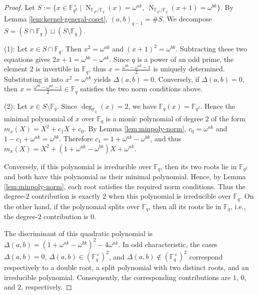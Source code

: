 \documentclass[10pt,a4paper]{article}
\newcommand{\Norm}{\operatorname{N}}
\numberwithin{equation}{section}
\begin{document}
\begin{proof}
Let
$S:=\{x\in \mathbb{F}_{q^2}^\times\mid \Norm_{\mathbb{F}_{q^2}/\mathbb{F}_q}(x)=\omega^{ak},\ \Norm_{\mathbb{F}_{q^2}/\mathbb{F}_q}(x+1)=\omega^{bk}\}$. By Lemma \ref{lem:kernel-general-coset}, $(a,b)_{q-1}=\#S$. We decompose $S=(S\cap \mathbb{F}_{q})\sqcup(S\setminus \mathbb{F}_{q})$.

\noindent\textup{(1)}: Let $x\in S\cap \mathbb{F}_{q}$. Then $x^2=\omega^{ak}$ and $(x+1)^2=\omega^{bk}$. Subtracting these two equations gives $2x+1=\omega^{bk}-\omega^{ak}$. Since $q$ is a power of an odd prime, the element $2$ is invertible in $\mathbb{F}_{q}$, thus $x=\frac{\omega^{bk}-\omega^{ak}-1}{2}$ is uniquely determined. Substituting it into $x^2=\omega^{ak}$ yields $\Delta(a,b)=0$. Conversely, if $\Delta(a,b)=0$, then $x=\frac{\omega^{bk}-\omega^{ak}-1}{2}\in \mathbb{F}_{q}$ satisfies the two norm conditions above.

\noindent\textup{(2)}: Let $x\in S\setminus \mathbb{F}_{q}$. Since $\deg_{\mathbb{F}_{q}}(x)=2$, we have $\mathbb{F}_{q}(x)=\mathbb{F}_{q^2}$. Hence the minimal polynomial of $x$ over $\mathbb{F}_{q}$ is a monic polynomial of degree $2$ of the form $m_x(X)=X^2+c_{1}X+c_{0}$. By Lemma \ref{lem:minpoly-norm}, $c_{0}=\omega^{ak}$ and $1-c_{1}+\omega^{ak}=\omega^{bk}$. Therefore $c_{1}=1+\omega^{ak}-\omega^{bk}$, and thus $m_{x}(X)=X^2+(1+\omega^{ak}-\omega^{bk})X+\omega^{ak}$.

Conversely, if this polynomial is irreducible over $\mathbb{F}_{q}$, then its two roots lie in $\mathbb{F}_{q^2}$ and both have this polynomial as their minimal polynomial. Hence, by Lemma \ref{lem:minpoly-norm}, each root satisfies the required norm conditions. Thus the degree-$2$ contribution is exactly $2$ when this polynomial is irreducible over $\mathbb{F}_{q}$. On the other hand, if the polynomial splits over $\mathbb{F}_{q}$, then all its roots lie in $\mathbb{F}_{q}$, i.e., the degree-$2$ contribution is $0$.

The discriminant of this quadratic polynomial is $\Delta(a,b)=(1+\omega^{ak}-\omega^{bk})^2-4\omega^{ak}$. In odd characteristic, the cases $\Delta(a,b)=0$, $\Delta(a,b)\in (\mathbb{F}_q^\times)^2$, and $\Delta(a,b)\notin (\mathbb{F}_q^\times)^2$ correspond respectively to a double root, a split polynomial with two distinct roots, and an irreducible polynomial. Consequently, the corresponding contributions are $1$, $0$, and $2$, respectively.
\end{proof}
\end{document}
